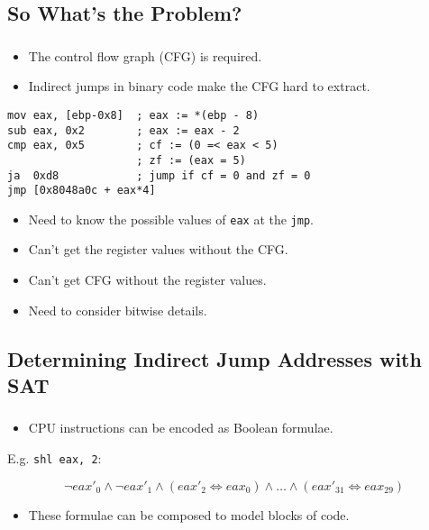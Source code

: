 \documentclass[compress]{beamer}
\begin{document}
\subsection{So What's the Problem?}
\begin{frame}[fragile]
	\frametitle{\insertsubsection}

	\begin{itemize}
		\item The control flow graph (CFG) is required.
		\item Indirect jumps in binary code make the CFG hard to extract.
	\end{itemize}

	\vfill

\begin{lstlisting}
mov eax, [ebp-0x8]  ; eax := *(ebp - 8)
sub eax, 0x2        ; eax := eax - 2
cmp eax, 0x5        ; cf := (0 =< eax < 5)
                    ; zf := (eax = 5)
ja  0xd8            ; jump if cf = 0 and zf = 0
jmp [0x8048a0c + eax*4]
\end{lstlisting}
\vfill

	\begin{itemize}
	\item Need to know the possible values of \texttt{eax} at the \texttt{jmp}.
	\item Can't get the register values without the CFG.
	\item Can't get CFG without the register values.
	\item Need to consider bitwise details.
	\end{itemize}
\vfill
\end{frame}


\subsection{Determining Indirect Jump Addresses with SAT}
\begin{frame}[fragile]
	\frametitle{\insertsubsection}

	\begin{itemize}
	\item CPU instructions can be encoded as Boolean formulae.
	\end{itemize}
	\vfill
	E.g. \texttt{shl eax, 2}:

	\[
                \neg eax'_{0} \wedge \neg eax'_{1} \wedge (eax'_{2}
                \Leftrightarrow eax_{0}) \wedge \ldots \wedge (eax'_{31}
                \Leftrightarrow eax_{29})
	\]


	\vfill

	\begin{itemize}
	\item These formulae can be composed to model blocks of code.
	\end{itemize}

\end{frame}
\end{document}
